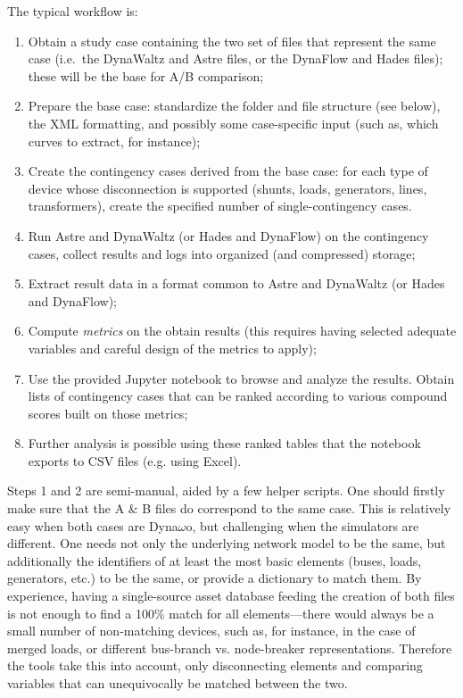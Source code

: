 \documentclass[conference]{IEEEtran}
\begin{document}
The typical workflow is:
\begin{enumerate}
  \item Obtain a study case containing the two set of files that represent the
        same case (i.e.~the DynaWaltz and Astre files, or the DynaFlow and Hades
        files); these will be the base for A/B comparison;
  \item Prepare the base case: standardize the folder and file structure (see
        below), the XML formatting, and possibly some case-specific input (such as,
        which curves to extract, for instance);
  \item Create the contingency cases derived from the base case: for each type
        of device whose disconnection is supported (shunts, loads, generators,
        lines, transformers), create the specified number of single-contingency
        cases.
  \item Run Astre and DynaWaltz (or Hades and DynaFlow) on the contingency
        cases, collect results and logs into organized (and compressed)
        storage;
  \item Extract result data in a format common to Astre and DynaWaltz (or Hades
        and DynaFlow);
  \item Compute \emph{metrics} on the obtain results (this requires having
        selected adequate variables and careful design of the metrics to apply);
  \item Use the provided Jupyter notebook to browse and analyze the results.
        Obtain lists of contingency cases that can be ranked according to various
        compound scores built on those metrics;
  \item Further analysis is possible using these ranked tables that
        the notebook exports to CSV files (e.g. using Excel).
\end{enumerate}

Steps 1 and 2 are semi-manual, aided by a few helper scripts.  One should
firstly make sure that the A \& B files do correspond to the same case. This is
relatively easy when both cases are Dyna$\omega$o, but challenging when the simulators
are different.  One needs not only the underlying network model to be the same,
but additionally the identifiers of at least the most basic elements (buses,
loads, generators, etc.) to be the same, or provide a dictionary to match them.
By experience, having a single-source asset database feeding the
creation of both files is not enough to find a 100\% match for all
elements---there would always be a small number of non-matching devices, such
as, for instance, in the case of merged loads, or different bus-branch
vs. node-breaker representations. Therefore the tools take this into account,
only disconnecting elements and comparing variables that can unequivocally be
matched between the two.
\end{document}
